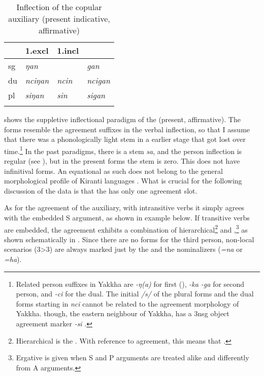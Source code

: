 \begin{table}[htp]
\begin{center}
\begin{tabular}{llll}
\lsptoprule
&{\sc 1.excl}&{\sc 1.incl}&{\sc 2}\\
\midrule
{\sc sg}&  \emph{ŋan}& &\emph{gan}\\
{\sc du} & \emph{nciŋan}&\emph{ncin}& \emph{ncigan} \\
{\sc pl}  & \emph{siŋan}& \emph{sin}&\emph{sigan}\\
\lspbottomrule
\end{tabular}
\caption{Inflection of the copular auxiliary (present indicative, affirmative)}\label{copula}
\end{center}
\end{table}

 shows the suppletive inflectional paradigm of the  (present, affirmative). The forms resemble the agreement suffixes in the verbal inflection, so that I assume that there was a phonologically light stem in a earlier stage that got lost over time.\footnote{Related person suffixes in Yakkha are \emph{-ŋ(a)} for first  (), \emph{-ka \ti -ga} for second person, and \emph{-ci} for the dual. The initial  \emph{/s/} of the plural  forms and the dual forms starting in \emph{nci} cannot be related to the agreement morphology of Yakkha.  though, the eastern neighbour of Yakkha, has a 3nsg object agreement marker \emph{-si} \citep[76]{Driem1987A-grammar}.}  In the past paradigms, there is a stem \emph{sa}, and the person inflection is regular (see ), but in the present forms the stem is zero. This  does not have infinitival forms. An equational  as such does not belong to the general morphological profile of Kiranti languages \citep[276]{Bickel1999Nominalization}. What is crucial for the following discussion of the data is that the  has only one agreement slot.



As for the agreement of the auxiliary, with intransitive verbs it simply agrees with the embedded S argument, as shown in example \Next[a] below. If transitive verbs are embedded, the agreement exhibits a combination of hierarchical\footnote{Hierarchical  is the  \citep[10]{Siewierska1998On-nominal}. With reference to agreement, this means that   \citep[66]{Nichols1992Language}.} and  ,\footnote{Ergative  is given when S and P arguments are treated alike and differently from A arguments. 
} as shown schematically in .  Since there are no forms for the third person, non-local scenarios (3>3) are always marked just by the  and the nominalizers (\emph{=na} or \emph{=ha}). 


